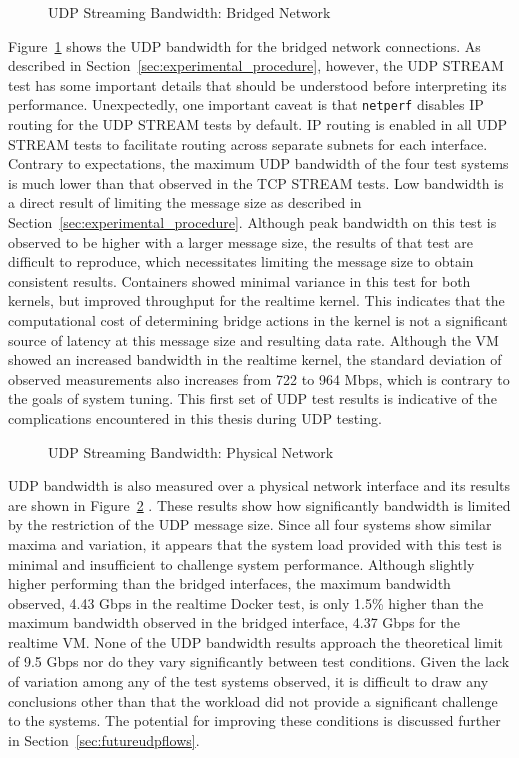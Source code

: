 \begin{figure}
    \centering
    \def\svgwidth{\columnwidth}
    
    \caption{UDP Streaming Bandwidth: Bridged Network}
    \label{fig:udp_stream_bridge}
\end{figure}
Figure~\ref{fig:udp_stream_bridge} shows the UDP bandwidth for the bridged network connections.  
As described in Section~\ref{sec:experimental_procedure}, however, the UDP STREAM test has some important details that should be understood before interpreting its performance.
Unexpectedly, one important caveat is that \texttt{netperf} disables IP routing for the UDP STREAM tests by default.
IP routing is enabled in all UDP STREAM tests to facilitate routing across separate subnets for each interface.
Contrary to expectations, the maximum UDP bandwidth of the four test systems is much lower than that observed in the TCP STREAM tests.
Low bandwidth is a direct result of limiting the message size as described in Section~\ref{sec:experimental_procedure}.
Although peak bandwidth on this test is observed to be higher with a larger message size, the results of that test are difficult to reproduce, which necessitates limiting the message size to obtain consistent results.  
Containers showed minimal variance in this test for both kernels, but improved throughput for the realtime kernel.  
This indicates that the computational cost of determining bridge actions in the kernel is not a significant source of latency at this message size and resulting data rate.
Although the VM showed an increased bandwidth in the realtime kernel, the standard deviation of observed measurements also increases from 722 to 964 Mbps, which is contrary to the goals of system tuning. 
This first set of UDP test results is indicative of the complications encountered in this thesis during UDP testing.

\begin{figure}
    \centering
    \def\svgwidth{\columnwidth}
    
    \caption{UDP Streaming Bandwidth: Physical Network}
    \label{fig:udp_stream_phys}
\end{figure}

UDP bandwidth is also measured over a physical network interface and its results are shown in Figure~\ref{fig:udp_stream_phys} .  
These results show how significantly bandwidth is limited by the restriction of the UDP message size.
Since all four systems show similar maxima and variation, it appears that the system load provided with this test is minimal and insufficient to challenge system performance.
Although slightly higher performing than the bridged interfaces, the maximum bandwidth observed, 4.43 Gbps in the realtime Docker test, is only 1.5\% higher than the maximum bandwidth observed in the bridged interface, 4.37 Gbps for the realtime VM. 
None of the UDP bandwidth results approach the theoretical limit of 9.5 Gbps nor do they vary significantly between test conditions.
Given the lack of variation among any of the test systems observed, it is difficult to draw any conclusions other than that the workload did not provide a significant challenge to the systems.
The potential for improving these conditions is discussed further in Section~\ref{sec:futureudpflows}.

